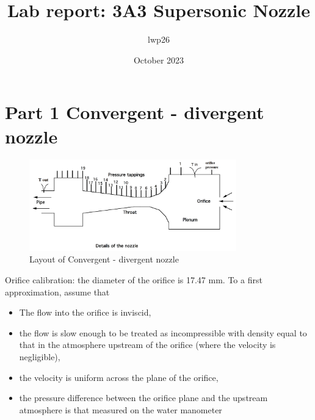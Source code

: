 \documentclass[8pt]{article}
\begin{document}

\title{Lab report: 3A3 Supersonic Nozzle}
\author{lwp26}
\date{October 2023}
\maketitle

\section{Part 1 Convergent - divergent nozzle}

\begin{figure}[H]
    \centering
    \includegraphics[width=0.8\textwidth]{small_nozzle_layout.png}
    \caption{Layout of Convergent - divergent nozzle}
    \label{fig:figure1}
\end{figure}

Orifice calibration: the diameter of the orifice is 17.47 mm. To a first approximation, assume that
\begin{itemize}
    \item The flow into the orifice is inviscid,
    \item the flow is slow enough to be treated as incompressible with density equal to that in the atmosphere upstream of the orifice (where the velocity is negligible),
    \item the velocity is uniform across the plane of the orifice,
    \item the pressure difference between the orifice plane and the upstream atmosphere is that measured on the
    water manometer
\end{itemize} 
\end{document}
